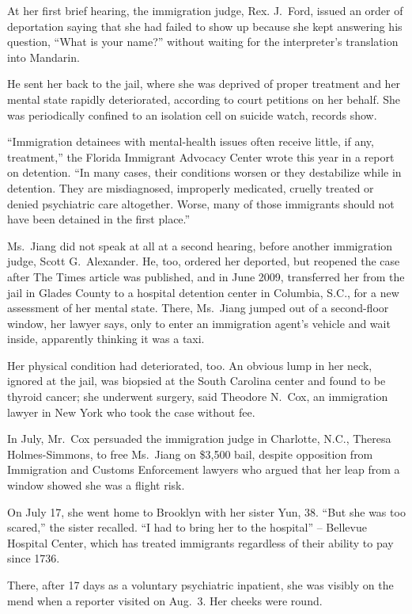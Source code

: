 ﻿\documentclass[12pt]{article}
\begin{document}
At her first brief hearing, the immigration judge, Rex. J.~Ford, issued an order of deportation
saying that she had failed to show up because she kept answering his question, ``What is your
name?'' without waiting for the interpreter's translation into Mandarin.

He sent her back to the jail, where she was deprived of proper treatment and her mental state
rapidly deteriorated\cite{deteriorate}, according to court petitions on her behalf. She was
periodically confined to an isolation cell on suicide watch, records show.

``Immigration detainees with mental-health issues often receive little, if any, treatment,'' the
Florida Immigrant Advocacy Center wrote this year in a report on detention. ``In many cases, their
conditions worsen or they destabilize while in detention. They are misdiagnosed, improperly
medicated, cruelly treated or denied psychiatric care altogether. Worse, many of those immigrants
should not have been detained in the first place.''

Ms.~Jiang did not speak at all at a second hearing, before another immigration judge, Scott
G.~Alexander. He, too, ordered her deported, but reopened the case after The Times article was
published, and in June 2009, transferred her from the jail in Glades County to a hospital detention
center in Columbia, S.C., for a new assessment of her mental state. There, Ms.~Jiang jumped out of a
second-floor window, her lawyer says, only to enter an immigration agent's vehicle and wait inside,
apparently thinking it was a taxi.

Her physical condition had deteriorated, too. An obvious lump in her neck, ignored at the jail, was
biopsied at the South Carolina center and found to be thyroid\cite{thyroid} cancer; she underwent
surgery, said Theodore N.~Cox, an immigration lawyer in New York who took the case without fee.

In July, Mr.~Cox persuaded the immigration judge in Charlotte, N.C., Theresa Holmes-Simmons, to free
Ms.~Jiang on \$3,500 bail, despite opposition from Immigration and Customs Enforcement lawyers who
argued that her leap from a window showed she was a flight risk.

On July 17, she went home to Brooklyn with her sister Yun, 38. ``But she was too scared,'' the
sister recalled. ``I had to bring her to the hospital'' -- Bellevue Hospital Center, which has
treated immigrants regardless of their ability to pay since 1736.

There, after 17 days as a voluntary psychiatric inpatient, she was visibly on the mend when a
reporter visited on Aug.~3. Her cheeks were round.
\end{document}
